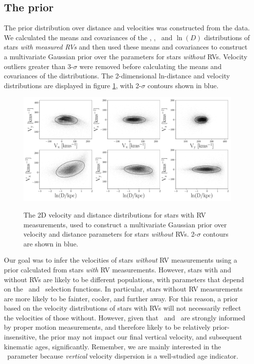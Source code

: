 \subsection{The prior}
\label{sec:prior}

The prior distribution over distance and velocities was constructed from the
data.
We calculated the means and covariances of the \vx, \vy, \vz\ and $\ln(D)$
distributions of stars {\it with measured RVs} and then used these means and
covariances to construct a multivariate Gaussian prior over the parameters for
stars {\it without} RVs.
Velocity outliers greater than 3-$\sigma$ were removed before calculating the
means and covariances of the distributions.
The 2-dimensional ln-distance and velocity distributions are displayed in
figure \ref{fig:prior_distributions_2D}, with 2-$\sigma$ contours shown in
blue.
\begin{figure}[ht!]
\caption{
The 2D velocity and distance distributions for stars with RV measurements,
    used to construct a multivariate Gaussian prior over velocity and
    distance parameters for stars {\it without} RVs.
2-$\sigma$ contours are shown in blue.
}
  \centering
    \includegraphics[width=1\textwidth]{prior_distributions_2D}
\label{fig:prior_distributions_2D}
\end{figure}

Our goal was to infer the velocities of stars {\it without} RV measurements
using a prior calculated from stars {\it with} RV measurements.
However, stars with and without RVs are likely to be different populations,
with parameters that depend on the \gaia\ and \lamost\ selection functions.
In particular, stars without RV measurements are more likely to be fainter,
cooler, and further away.
For this reason, a prior based on the velocity distributions of stars with RVs
will not necessarily reflect the velocities of those without.
However, given that \vx\ and \vz\ are strongly informed by proper motion
measurements, and therefore likely to be relatively prior-insensitive, the
prior may not impact our final vertical velocity, and subsequent kinematic
ages, significantly.
Remember, we are mainly interested in the \vz\ parameter because {\it
vertical} velocity dispersion is a well-studied age indicator.

